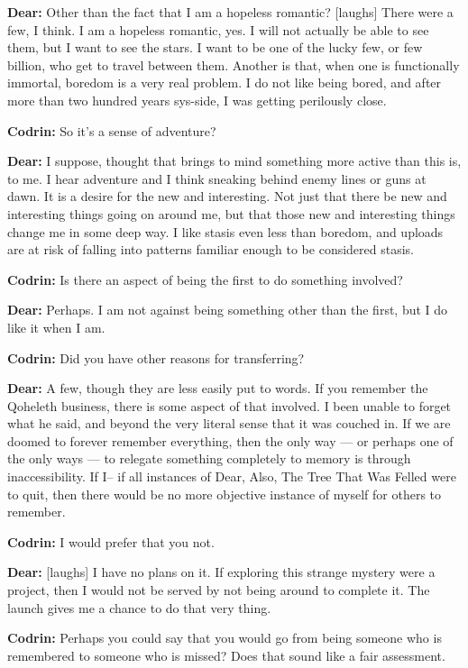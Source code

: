 \textbf{Dear:} Other than the fact that I am a hopeless romantic? {[}laughs{]} There were a few, I think. I am a hopeless romantic, yes. I will not actually be able to see them, but I want to see the stars. I want to be one of the lucky few, or few billion, who get to travel between them. Another is that, when one is functionally immortal, boredom is a very real problem. I do not like being bored, and after more than two hundred years sys-side, I was getting perilously close.

\textbf{Codrin:} So it's a sense of adventure?

\textbf{Dear:} I suppose, thought that brings to mind something more active than this is, to me. I hear adventure and I think sneaking behind enemy lines or guns at dawn. It is a desire for the new and interesting. Not just that there be new and interesting things going on around me, but that those new and interesting things change me in some deep way. I like stasis even less than boredom, and uploads are at risk of falling into patterns familiar enough to be considered stasis.

\textbf{Codrin:} Is there an aspect of being the first to do something involved?

\textbf{Dear:} Perhaps. I am not against being something other than the first, but I do like it when I am.

\textbf{Codrin:} Did you have other reasons for transferring?

\textbf{Dear:} A few, though they are less easily put to words. If you remember the Qoheleth business, there is some aspect of that involved. I been unable to forget what he said, and beyond the very literal sense that it was couched in. If we are doomed to forever remember everything, then the only way — or perhaps one of the only ways — to relegate something completely to memory is through inaccessibility. If I-- if all instances of Dear, Also, The Tree That Was Felled were to quit, then there would be no more objective instance of myself for others to remember.

\textbf{Codrin:} I would prefer that you not.

\textbf{Dear:} {[}laughs{]} I have no plans on it. If exploring this strange mystery were a project, then I would not be served by not being around to complete it. The launch gives me a chance to do that very thing.

\textbf{Codrin:} Perhaps you could say that you would go from being someone who is remembered to someone who is missed? Does that sound like a fair assessment.

